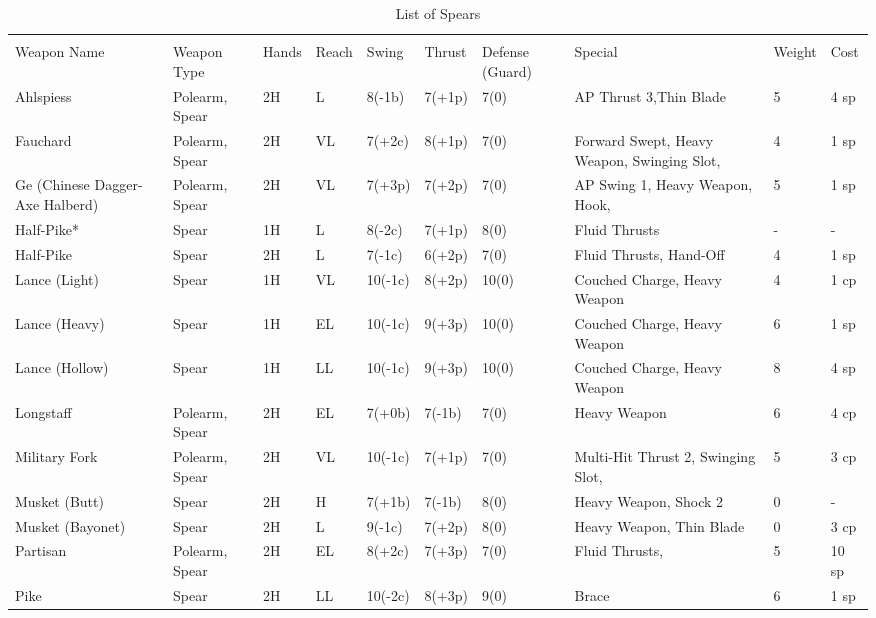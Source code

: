 \documentclass[oneside,11pt,english]{book}
\begin{document}
\begin{longtabu} to 1\linewidth {X[2,l] X X[-1,c] X[-1,c] XX X[-1,c] X[2,l] X[-3,c] X[-3,r]}
	\caption{List of Spears}\\
	\label{tab:Spears}\\
Weapon Name						&Weapon Type			&Hands	&Reach	&Swing		&Thrust	&Defense (Guard)	&Special																	&Weight	&Cost\\\toprule\endhead
Ahlspiess 						&Polearm, Spear			&2H		&L		&8(-1b)		&7(+1p) &7(0)				&AP Thrust 3,Thin Blade 													&5		&4 sp\\
Fauchard 						&Polearm, Spear			&2H		&VL 	&7(+2c)		&8(+1p) &7(0)				&Forward Swept, Heavy Weapon, Swinging Slot,								&4		&1 sp\\
Ge (Chinese Dagger-Axe Halberd)	&Polearm, Spear			&2H		&VL 	&7(+3p)		&7(+2p) &7(0)				&AP Swing 1, Heavy Weapon, Hook,											&5		&1 sp\\
Half-Pike* 						&Spear					&1H		&L		&8(-2c)		&7(+1p) &8(0)				&Fluid Thrusts																&-		&-\\
Half-Pike 						&Spear 					&2H		&L		&7(-1c)		&6(+2p) &7(0)				&Fluid Thrusts, Hand-Off 													&4		&1 sp\\
Lance (Light) 					&Spear 					&1H		&VL		&10(-1c)	&8(+2p) &10(0)				&Couched Charge, Heavy Weapon 												&4		&1 cp\\
Lance (Heavy) 					&Spear 					&1H		&EL		&10(-1c)	&9(+3p) &10(0)				&Couched Charge, Heavy Weapon 												&6		&1 sp\\
Lance (Hollow) 					&Spear 					&1H		&LL		&10(-1c)	&9(+3p) &10(0)				&Couched Charge, Heavy Weapon 												&8		&4 sp\\
Longstaff 						&Polearm, Spear			&2H		&EL		&7(+0b)		&7(-1b) &7(0)				&Heavy Weapon																&6		&4 cp\\
Military Fork 					&Polearm, Spear			&2H		&VL		&10(-1c)	&7(+1p) &7(0)				&Multi-Hit Thrust 2, Swinging Slot, 										&5		&3 cp\\
Musket (Butt) 					&Spear					&2H		&H		&7(+1b)		&7(-1b) &8(0)				&Heavy Weapon, Shock 2														&0		&-\\
Musket (Bayonet) 				&Spear					&2H		&L		&9(-1c)		&7(+2p) &8(0)				&Heavy Weapon, Thin Blade													&0		&3 cp\\
Partisan 						&Polearm, Spear			&2H		&EL		&8(+2c)		&7(+3p) &7(0)				&Fluid Thrusts,																&5		&10 sp\\
Pike 							&Spear 					&2H		&LL		&10(-2c)	&8(+3p) &9(0)				&Brace																		&6		&1 sp\\

\end{longtabu}
\end{document}
